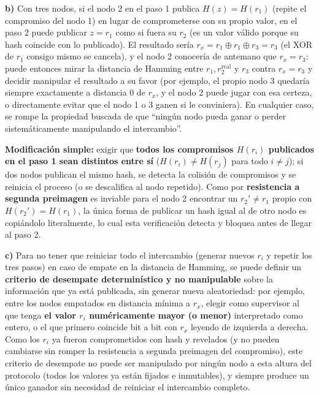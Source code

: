\textbf{b)} Con tres nodos, si el nodo 2 en el paso 1 publica $H(z)=H(r_1)$ (repite el
compromiso del nodo 1) en lugar de comprometerse con su propio valor, en el paso 2 puede
publicar $z=r_1$ como si fuera su $r_2$ (es un valor válido porque su hash coincide con lo
publicado). El resultado sería $r_x = r_1\oplus r_1\oplus r_3 = r_3$ (el XOR de $r_1$ consigo
mismo se cancela), y el nodo 2 conocería de antemano que $r_x=r_3$: puede entonces mirar la
distancia de Hamming entre $r_1,r_2^{\text{real}}$ y $r_3$ contra $r_x=r_3$ y decidir
manipular el resultado a su favor (por ejemplo, el propio nodo 3 quedaría siempre exactamente
a distancia 0 de $r_x$, y el nodo 2 puede jugar con esa certeza, o directamente evitar que el
nodo 1 o 3 ganen si le conviniera). En cualquier caso, se rompe la propiedad buscada de que
``ningún nodo pueda ganar o perder sistemáticamente manipulando el intercambio''.

\textbf{Modificación simple:} exigir que \textbf{todos los compromisos $H(r_i)$ publicados en
el paso 1 sean distintos entre sí} ($H(r_i)\neq H(r_j)$ para todo $i\neq j$); si dos nodos
publican el mismo hash, se detecta la colisión de compromisos y se reinicia el proceso (o se
descalifica al nodo repetido). Como por \textbf{resistencia a segunda preimagen} es inviable
para el nodo 2 encontrar un $r_2'\neq r_1$ propio con $H(r_2')=H(r_1)$, la única forma de
publicar un hash igual al de otro nodo es copiándolo literalmente, lo cual esta verificación
detecta y bloquea antes de llegar al paso 2.

\textbf{c)} Para no tener que reiniciar todo el intercambio (generar nuevos $r_i$ y repetir
los tres pasos) en caso de empate en la distancia de Hamming, se puede definir un
\textbf{criterio de desempate determinístico y no manipulable} sobre la información que ya
está publicada, sin generar nueva aleatoriedad: por ejemplo, entre los nodos empatados en
distancia mínima a $r_x$, elegir como supervisor al que tenga \textbf{el valor $r_i$
numéricamente mayor (o menor)} interpretado como entero, o el que primero coincide bit a bit
con $r_x$ leyendo de izquierda a derecha. Como los $r_i$ ya fueron comprometidos con hash y
revelados (y no pueden cambiarse sin romper la resistencia a segunda preimagen del
compromiso), este criterio de desempate no puede ser manipulado por ningún nodo a esta
altura del protocolo (todos los valores ya están fijados e inmutables), y siempre produce un
único ganador sin necesidad de reiniciar el intercambio completo.

